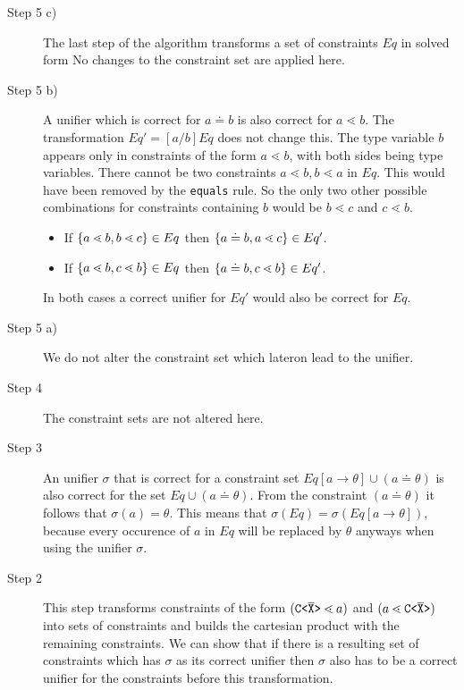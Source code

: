 \begin{description}
\item[Step 5 c)]
The last step of the algorithm transforms a set of constraints $Eq$ in solved form
No changes to the constraint set are applied here.

\item[Step 5 b)]
A unifier which is correct for $a \doteq b$ is also correct for $a \lessdot b$.
The transformation $Eq' = [a/b]Eq$ does not change this.
The type variable $b$ appears only in constraints of the form $a \lessdot b$,
with both sides being type variables.
There cannot be two constraints $a \lessdot b, b \lessdot a$ in $Eq$.
This would have been removed by the \texttt{equals} rule.
So the only two other possible combinations for constraints containing $b$ would be $b \lessdot c$ and $c \lessdot b$.
\begin{itemize}
\item If $\{ a \lessdot b, b \lessdot c \} \in Eq$ then $\{ a \doteq b, a \lessdot c \} \in Eq'$.
\item If $\{ a \lessdot b, c \lessdot b \} \in Eq$ then $\{ a \doteq b, c \lessdot b \} \in Eq'$.
\end{itemize}
In both cases a correct unifier for $Eq'$ would also be correct for $Eq$.

\item[Step 5 a)]
We do not alter the constraint set which lateron lead to the unifier.

\item[Step 4]
The constraint sets are not altered here.

\item[Step 3]
An unifier $\sigma$ that is correct for a constraint set
$Eq[a \to \theta] \cup (a \doteq \theta)$ is also correct for
the set $Eq \cup (a \doteq \theta)$.
From the constraint $(a \doteq \theta)$ it follows that $\sigma(a) = \theta$.
This means that $\sigma(Eq) = \sigma(Eq[a \to \theta])$,
because every occurence of $a$ in $Eq$ will be replaced by $\theta$ anyways when using the unifier $\sigma$.

\item[Step 2]
This step transforms constraints of the form $(\mathtt{C \texttt{<} \overline{\tt X} \texttt{>} } \lessdot a)$ and $(a \lessdot \mathtt{C \texttt{<} \overline{\tt X} \texttt{>} })$
into sets of constraints and builds the cartesian product with the remaining constraints.
We can show that if there is a resulting set of constraints which has $\sigma$ as its correct unifier
then $\sigma$ also has to be a correct unifier for the constraints before this transformation.


\end{description}

